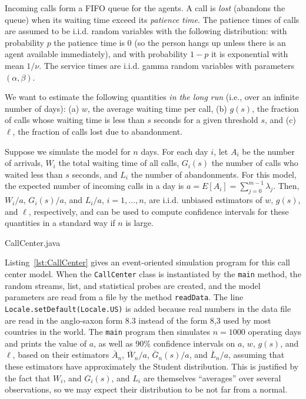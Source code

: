 Incoming calls form a FIFO queue for the agents.
A call is \emph{lost} (abandons the queue) when its waiting time
exceed its \emph{patience time}.
The patience times of calls are assumed to be i.i.d.{} random variables
with the following distribution: with probability $p$ the patience
time is 0 (so the person hangs up unless there is an agent
available immediately), and with probability $1-p$ it is exponential
with mean $1/\nu$.
The service times
are i.i.d.{} gamma random variables with parameters $(\alpha,\beta)$.

We want to estimate the following quantities
\emph{in the long run} (i.e., over an infinite number of days):
(a) $w$, the average waiting time per call,
(b) $g(s)$, the fraction of calls whose waiting time is less than
    $s$ seconds for a given threshold $s$, and
(c) $\ell$, the fraction of calls lost due to abandonment.

Suppose we simulate the model for $n$ days.  For each day $i$, let
$A_i$ be the number of arrivals,
$W_i$ the total waiting time of all calls,
$G_i(s)$ the number of calls who waited less than $s$ seconds,
and $L_i$ the number of abandonments.
For this model, the expected number of incoming calls in a day is
$a = E[A_i] = \sum_{j=0}^{m-1} \lambda_j$.
Then, $W_i/a$, $G_i(s)/a$, and $L_i/a$, $i=1,\dots,n$,
are i.i.d.{} unbiased estimators of $w$, $g(s)$, and $\ell$, respectively,
and can be used to compute confidence intervals for these quantities
in a standard way if $n$ is large.


%
{CallCenter.java}


Listing~\ref{lst:CallCenter} gives an event-oriented simulation
program for this call center model.
When the \texttt{CallCenter} class is instantiated by the \texttt{main} method,
the random streams, list, and statistical probes are created,
and the model parameters are read from a file by the method \texttt{readData}.
The line \texttt{Locale.setDefault(Locale.US)} is added because
real numbers in the data file are read in the anglo-saxon form 8.3
instead of the form 8,3 used by most countries in the world.
The \texttt{main} program then simulates $n = 1000$ operating days and
prints the value of $a$, as well as 90\%{} confidence intervals on
$a$, $w$, $g(s)$, and $\ell$, based on their estimators
$\bar A_n$, $\bar W_n/a$, $\bar G_n(s)/a$, and $\bar L_n/a$,
assuming that these estimators have approximately the Student distribution.
This is justified by the fact that $W_i$, and $G_i(s)$, and $L_i$
are themselves ``averages'' over several observations, so we may expect
their distribution to be not far from a normal.

